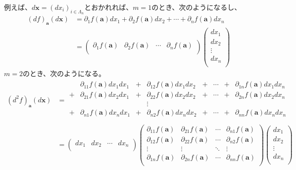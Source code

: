 \documentclass[dvipdfmx]{jsarticle}
\begin{document}
例えば、$d\mathbf{x} = \left( dx_{i} \right)_{i \in \varLambda_{n}}$とおかれれば、$m = 1$のとき、次のようになるし、
\begin{align*}
(df)_{\mathbf{a}}\left( d\mathbf{x} \right) &= \partial_{1}f\left( \mathbf{a} \right)dx_{1} + \partial_{2}f\left( \mathbf{a} \right)dx_{2} + \cdots + \partial_{n}f\left( \mathbf{a} \right)dx_{n}\\
&= \begin{pmatrix}
\partial_{1}f\left( \mathbf{a} \right) & \partial_{2}f\left( \mathbf{a} \right) & \cdots & \partial_{n}f\left( \mathbf{a} \right) \\
\end{pmatrix}\begin{pmatrix}
dx_{1} \\
dx_{2} \\
 \vdots \\
dx_{n} \\
\end{pmatrix}
\end{align*}
$m = 2$のとき、次のようになる。
\begin{align*}
\left( d^{2}f \right)_{\mathbf{a}}\left( d\mathbf{x} \right) &= \begin{matrix}
\  & \partial_{11}f\left( \mathbf{a} \right)dx_{1}dx_{1} & + & \partial_{12}f\left( \mathbf{a} \right)dx_{1}dx_{2} & + & \cdots & + & \partial_{1n}f\left( \mathbf{a} \right)dx_{1}dx_{n} \\
 + & \partial_{21}f\left( \mathbf{a} \right)dx_{2}dx_{1} & + & \partial_{22}f\left( \mathbf{a} \right)dx_{2}dx_{2} & + & \cdots & + & \partial_{2n}f\left( \mathbf{a} \right)dx_{2}dx_{n} \\
\  & \  & \  & \vdots & \  & \  & \  & \  \\
 + & \partial_{n1}f\left( \mathbf{a} \right)dx_{n}dx_{1} & + & \partial_{n2}f\left( \mathbf{a} \right)dx_{n}dx_{2} & + & \cdots & + & \partial_{nn}f\left( \mathbf{a} \right)dx_{n}dx_{n} \\
\end{matrix}\\
&= \begin{pmatrix}
dx_{1} & dx_{2} & \cdots & dx_{n} \\
\end{pmatrix}\begin{pmatrix}
\partial_{11}f\left( \mathbf{a} \right) & \partial_{21}f\left( \mathbf{a} \right) & \cdots & \partial_{n1}f\left( \mathbf{a} \right) \\
\partial_{12}f\left( \mathbf{a} \right) & \partial_{22}f\left( \mathbf{a} \right) & \cdots & \partial_{n2}f\left( \mathbf{a} \right) \\
 \vdots & \vdots & \ddots & \vdots \\
\partial_{1n}f\left( \mathbf{a} \right) & \partial_{2n}f\left( \mathbf{a} \right) & \cdots & \partial_{nn}f\left( \mathbf{a} \right) \\
\end{pmatrix}\begin{pmatrix}
dx_{1} \\
dx_{2} \\
 \vdots \\
dx_{n} \\
\end{pmatrix}
\end{align*}
\end{document}
